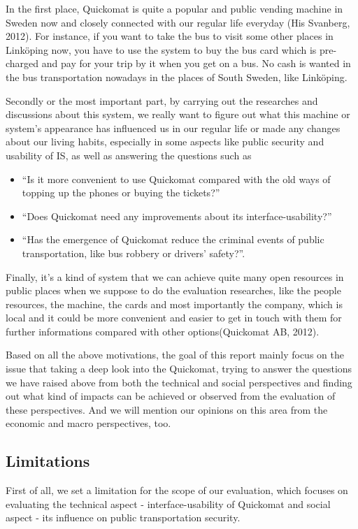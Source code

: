 \documentclass[twocolumn]{article}
\begin{document}
In the first place, Quickomat is quite a popular and public vending machine in Sweden now and closely connected with our regular life everyday (His Svanberg, 2012). For instance, if you want to take the bus to visit some other places in Linköping now, you have to use the system to buy the bus card which is pre-charged and pay for your trip by it when you get on a bus. No cash is wanted in the bus transportation nowadays in the places of South Sweden, like Linköping.

Secondly or the most important part, by carrying out the researches and discussions about this system, we really want to figure out what this machine or system’s appearance has influenced us in our regular life or made any changes about our living habits, especially in some aspects like public security and usability of IS, as well as answering the questions such as
\begin{itemize}
  \item “Is it more convenient to use Quickomat compared with the old ways of topping up the phones or buying the tickets?”
  \item “Does Quickomat need any improvements  about its interface-usability?”
  \item “Has the emergence of Quickomat reduce the criminal events of public transportation, like bus robbery or drivers’ safety?”.
\end{itemize}

Finally, it’s a kind of system that we can achieve quite many open resources in public places when we suppose to do the evaluation researches, like the people resources, the machine, the cards and most importantly the company, which is local and it could be more convenient and easier to get in touch with them for further informations compared with other options(Quickomat AB, 2012). 

Based on all the above motivations, the goal of this report mainly focus on the issue that taking a deep look into the Quickomat, trying to answer the questions we have raised above from both the technical and social perspectives and finding out what kind of impacts can be achieved or observed from the evaluation of these perspectives. And we will mention our opinions on this area from the economic and macro perspectives, too.

\subsection{Limitations}
First of all, we set a limitation for the scope of our evaluation, which focuses on evaluating the technical aspect - interface-usability of Quickomat and social aspect - its influence on public transportation security. 
\end{document}
